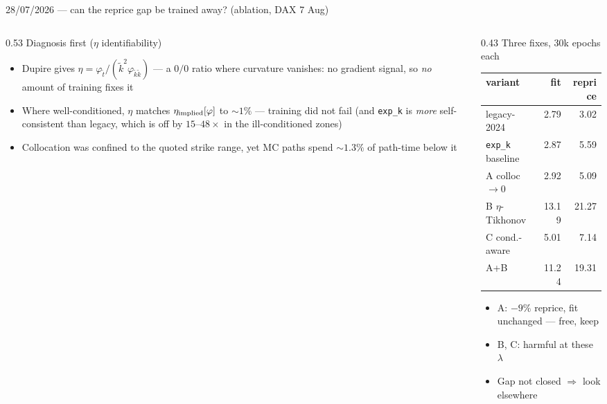 \documentclass[aspectratio=169,11pt]{beamer}
\newcommand{\gold}[1]{{\color{ntugold}#1}}
\newcommand{\red}[1]{{\color{ntured}#1}}
\begin{document}
\begin{frame}{28/07/2026 --- can the reprice gap be trained away? (ablation, DAX 7 Aug)}
  \begin{columns}[T]
    \begin{column}{0.53\linewidth}
      \gold{Diagnosis first} ($\eta$ identifiability)
      \begin{itemize}\small
        \item Dupire gives $\eta=\varphi_{\tilde t}/(\tilde k^2\varphi_{\tilde k\tilde k})$ --- a \red{$0/0$} ratio where
              curvature vanishes: no gradient signal, so \emph{no} amount of training fixes it
        \item Where well-conditioned, $\eta$ matches $\eta_{\rm implied}[\varphi]$ to \gold{$\sim\!1\%$} ---
              training did \red{not} fail (and \texttt{exp\_k} is \emph{more} self-consistent than legacy,
              which is off by $15$--$48\times$ in the ill-conditioned zones)
        \item Collocation was confined to the quoted strike range, yet MC paths spend $\sim\!1.3\%$ of
              path-time below it
      \end{itemize}
    \end{column}
    \begin{column}{0.43\linewidth}
      \gold{Three fixes, 30k epochs each}
      \begin{center}\scriptsize
      \begin{tabular}{lrr}
        \toprule
        variant & fit & reprice \\
        \midrule
        legacy-2024        &  2.79 &  3.02 \\
        \texttt{exp\_k} baseline &  2.87 &  5.59 \\
        A colloc$\to$0     &  2.92 & \gold{5.09} \\
        B $\eta$-Tikhonov  & 13.19 & 21.27 \\
        C cond.-aware      &  5.01 &  7.14 \\
        A+B                & 11.24 & 19.31 \\
        \bottomrule
      \end{tabular}
      \end{center}
      \begin{itemize}\small
        \item A: $-9\%$ reprice, fit unchanged --- free, keep
        \item B, C: \red{harmful} at these $\lambda$
        \item Gap \red{not} closed $\Rightarrow$ look elsewhere
      \end{itemize}
    \end{column}
  \end{columns}
\end{frame}
\end{document}

